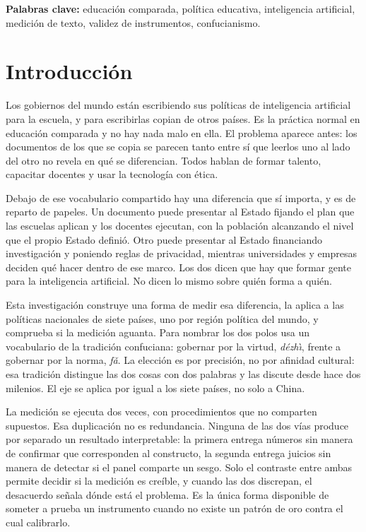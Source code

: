 \documentclass[12pt,letterpaper]{article}
\newcommand{\dezhi}{\textit{d\'ezh\`{\i}}}
\newcommand{\fa}{\textit{f\v{a}}}
\newcommand{\zhg}[1]{}
\begin{document}
\vspace{0.5em}
\noindent\textbf{Palabras clave:} educación comparada, política educativa, inteligencia artificial, medición de texto, validez de instrumentos, confucianismo.


\section{Introducción}

Los gobiernos del mundo están escribiendo sus políticas de inteligencia artificial para la escuela, y para escribirlas copian de otros países. Es la práctica normal en educación comparada y no hay nada malo en ella. El problema aparece antes: los documentos de los que se copia se parecen tanto entre sí que leerlos uno al lado del otro no revela en qué se diferencian. Todos hablan de formar talento, capacitar docentes y usar la tecnología con ética.

Debajo de ese vocabulario compartido hay una diferencia que sí importa, y es de reparto de papeles. Un documento puede presentar al Estado fijando el plan que las escuelas aplican y los docentes ejecutan, con la población alcanzando el nivel que el propio Estado definió. Otro puede presentar al Estado financiando investigación y poniendo reglas de privacidad, mientras universidades y empresas deciden qué hacer dentro de ese marco. Los dos dicen que hay que formar gente para la inteligencia artificial. No dicen lo mismo sobre quién forma a quién.

Esta investigación construye una forma de medir esa diferencia, la aplica a las políticas nacionales de siete países, uno por región política del mundo, y comprueba si la medición aguanta. Para nombrar los dos polos usa un vocabulario de la tradición confuciana: gobernar por la virtud, \dezhi\zhg{德治}, frente a gobernar por la norma, \fa\zhg{法}. La elección es por precisión, no por afinidad cultural: esa tradición distingue las dos cosas con dos palabras y las discute desde hace dos milenios. El eje se aplica por igual a los siete países, no solo a China.

La medición se ejecuta dos veces, con procedimientos que no comparten supuestos. Esa duplicación no es redundancia. Ninguna de las dos vías produce por separado un resultado interpretable: la primera entrega números sin manera de confirmar que corresponden al constructo, la segunda entrega juicios sin manera de detectar si el panel comparte un sesgo. Solo el contraste entre ambas permite decidir si la medición es creíble, y cuando las dos discrepan, el desacuerdo señala dónde está el problema. Es la única forma disponible de someter a prueba un instrumento cuando no existe un patrón de oro contra el cual calibrarlo.
\end{document}
